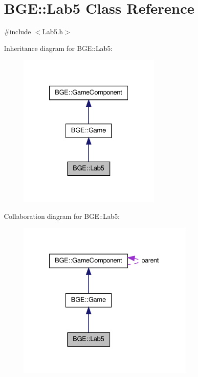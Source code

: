 \hypertarget{class_b_g_e_1_1_lab5}{\section{B\-G\-E\-:\-:Lab5 Class Reference}
\label{class_b_g_e_1_1_lab5}
}


{\ttfamily \#include $<$Lab5.\-h$>$}



Inheritance diagram for B\-G\-E\-:\-:Lab5\-:
\nopagebreak
\begin{figure}[H]
\begin{center}
\leavevmode
\includegraphics[width=200pt]{class_b_g_e_1_1_lab5__inherit__graph}
\end{center}
\end{figure}


Collaboration diagram for B\-G\-E\-:\-:Lab5\-:
\nopagebreak
\begin{figure}[H]
\begin{center}
\leavevmode
\includegraphics[width=249pt]{class_b_g_e_1_1_lab5__coll__graph}
\end{center}
\end{figure}
